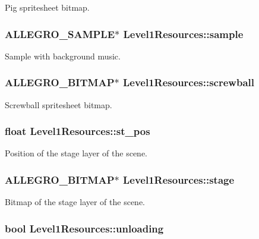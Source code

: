 Pig spritesheet bitmap. \hypertarget{structLevel1Resources_af8eaef9b18591372ed4d8a9aae3f4405}{
\subsubsection[{sample}]{\setlength{\rightskip}{0pt plus 5cm}A\+L\+L\+E\+G\+R\+O\+\_\+\+S\+A\+M\+P\+L\+E$\ast$ Level1\+Resources\+::sample}}\label{structLevel1Resources_af8eaef9b18591372ed4d8a9aae3f4405}
Sample with background music. \hypertarget{structLevel1Resources_a275302851e2a408d5e8ad7d397e64cd0}{
\subsubsection[{screwball}]{\setlength{\rightskip}{0pt plus 5cm}A\+L\+L\+E\+G\+R\+O\+\_\+\+B\+I\+T\+M\+A\+P$\ast$ Level1\+Resources\+::screwball}}\label{structLevel1Resources_a275302851e2a408d5e8ad7d397e64cd0}
Screwball spritesheet bitmap. \hypertarget{structLevel1Resources_a8caf638b14d7ef84a69b1a81050090ab}{
\subsubsection[{st\+\_\+pos}]{\setlength{\rightskip}{0pt plus 5cm}float Level1\+Resources\+::st\+\_\+pos}}\label{structLevel1Resources_a8caf638b14d7ef84a69b1a81050090ab}
Position of the stage layer of the scene. \hypertarget{structLevel1Resources_ac9a1fff6cf6e265817484c859650d039}{
\subsubsection[{stage}]{\setlength{\rightskip}{0pt plus 5cm}A\+L\+L\+E\+G\+R\+O\+\_\+\+B\+I\+T\+M\+A\+P$\ast$ Level1\+Resources\+::stage}}\label{structLevel1Resources_ac9a1fff6cf6e265817484c859650d039}
Bitmap of the stage layer of the scene. \hypertarget{structLevel1Resources_a646f78b5f30adf8f93e114cad75f250d}{
\subsubsection[{unloading}]{\setlength{\rightskip}{0pt plus 5cm}bool Level1\+Resources\+::unloading}}\label{structLevel1Resources_a646f78b5f30adf8f93e114cad75f250d}

